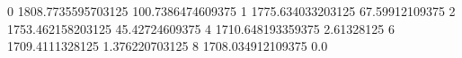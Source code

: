 0 1808.7735595703125 100.7386474609375
1 1775.634033203125 67.59912109375
2 1753.462158203125 45.42724609375
4 1710.648193359375 2.61328125
6 1709.4111328125 1.376220703125
8 1708.034912109375 0.0
